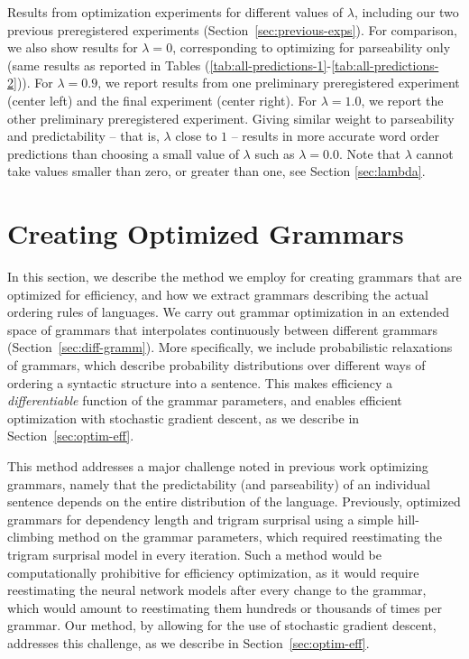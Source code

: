 \documentclass[10pt,twoside,lineno]{article}
\begin{document}
\begin{table}[hbt!]
\begin{center}
	\end{center}
	\caption{Results from optimization experiments for different values of $\lambda$, including our two previous preregistered experiments (Section~\ref{sec:previous-exps}). For comparison, we also show results for $\lambda=0$, corresponding to optimizing for parseability only (same results as reported in Tables (\ref{tab:all-predictions-1}-\ref{tab:all-predictions-2})). For $\lambda=0.9$, we report results from one preliminary preregistered experiment (center left) and the final experiment (center right). For $\lambda=1.0$, we report the other preliminary preregistered experiment.
Giving similar weight to parseability and predictability -- that is, $\lambda$ close to $1$ -- results in more accurate word order predictions than choosing a small value of $\lambda$ such as $\lambda=0.0$. Note that $\lambda$ cannot take values smaller than zero, or greater than one, see Section \ref{sec:lambda}.
}\label{table:corr-resu-previous}
\end{table}



\section{Creating Optimized Grammars}

In this section, we describe the method we employ for creating grammars that are optimized for efficiency, and how we extract grammars describing the actual ordering rules of languages.
We carry out grammar optimization in an extended space of grammars that interpolates continuously between different grammars (Section~\ref{sec:diff-gramm}).
More specifically, we include probabilistic relaxations of grammars, which describe probability distributions over different ways of ordering a syntactic structure into a sentence.
This makes efficiency a \emph{differentiable} function of the grammar parameters, and enables efficient optimization with stochastic gradient descent, as we describe in Section~\ref{sec:optim-eff}.

This method addresses a major challenge noted in previous work optimizing grammars, namely that the predictability (and parseability) of an individual sentence depends on the entire distribution of the language.
Previously, \citet{gildea2015human} optimized grammars for dependency length and trigram surprisal using a simple hill-climbing method on the grammar parameters, which required reestimating the trigram surprisal model in every iteration.
Such a method would be computationally prohibitive for efficiency optimization, as it would require reestimating the neural network models after every change to the grammar, which would amount to reestimating them hundreds or thousands of times per grammar.
Our method, by allowing for the use of stochastic gradient descent, addresses this challenge, as we describe in Section~\ref{sec:optim-eff}.
\end{document}
